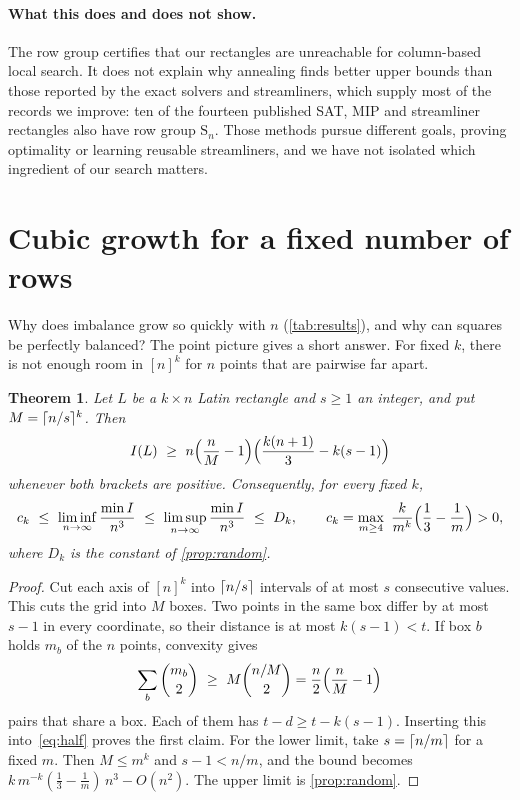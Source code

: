 \documentclass[11pt]{article}
\theoremstyle{plain}
\newtheorem{theorem}{Theorem}
\theoremstyle{definition}
\theoremstyle{remark}
\newcommand{\Sym}{\mathrm{S}}
\DeclarePairedDelimiter{\ceil}{\lceil}{\rceil}
\begin{document}
\paragraph{What this does and does not show.} The row group certifies that our rectangles are
unreachable for column-based local search. It does not explain why annealing finds better upper
bounds than those reported by the exact solvers and streamliners, which supply most of the records we
improve: ten of the fourteen published SAT, MIP and streamliner rectangles also have row group
$\Sym_n$. Those methods pursue different goals, proving optimality or learning reusable
streamliners, and we have not isolated which ingredient of our search matters.

\section{Cubic growth for a fixed number of rows}\label{sec:cubic}

Why does imbalance grow so quickly with $n$ (\cref{tab:results}), and why can squares be perfectly
balanced? The point picture gives a short answer. For fixed $k$, there is not enough room in
$[n]^k$ for $n$ points that are pairwise far apart.

\begin{theorem}\label{thm:cubic}
Let $L$ be a $k\times n$ Latin rectangle and $s\ge 1$ an integer, and put
$M=\ceil{n/s}^k$. Then
\[
  I(L)\ \ge\ n\Bigl(\frac nM-1\Bigr)\Bigl(\frac{k(n+1)}3-k(s-1)\Bigr)
\]
whenever both brackets are positive. Consequently, for every fixed $k$,
\[
  c_k\ \le\ \liminf_{n\to\infty}\frac{\min I}{n^3}\ \le\ \limsup_{n\to\infty}\frac{\min I}{n^3}\ \le\ D_k,
  \qquad
  c_k=\max_{m\ge 4}\ \frac{k}{m^k}\Bigl(\frac13-\frac1m\Bigr)>0 ,
\]
where $D_k$ is the constant of \cref{prop:random}.
\end{theorem}

\begin{proof}
Cut each axis of $[n]^k$ into $\ceil{n/s}$ intervals of at most $s$ consecutive values. This
cuts the grid into $M$ boxes. Two points in the same box differ by at most $s-1$ in every
coordinate, so their distance is at most $k(s-1)<t$. If box $b$ holds $m_b$ of the $n$ points,
convexity gives
\[
  \sum_b\binom{m_b}{2}\ \ge\ M\binom{n/M}{2}=\frac n2\Bigl(\frac nM-1\Bigr)
\]
pairs that share a box. Each of them has $t-d\ge t-k(s-1)$. Inserting this
into~\eqref{eq:half} proves the first claim. For the lower limit, take $s=\ceil{n/m}$ for a
fixed $m$. Then $M\le m^k$ and $s-1<n/m$, and the bound becomes
$k\,m^{-k}(\frac13-\frac1m)\,n^3-O(n^2)$. The upper limit is \cref{prop:random}.
\end{proof}
\end{document}

